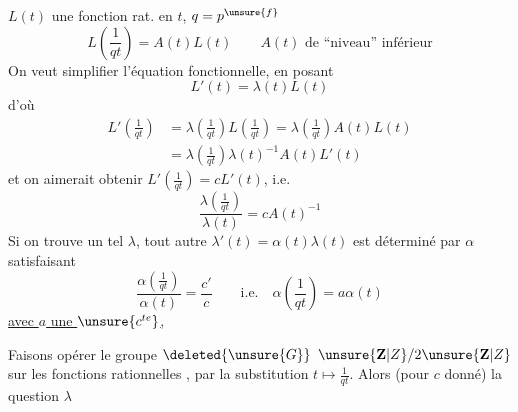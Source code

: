 $L(t)$ une fonction rat. en $t$,  $q=p^{\unsure{f}}$
\[
L\left(\frac1{qt}\right)=A(t)L(t)\qquad A(t)\text{ de ``niveau'' inférieur}
\]
On veut simplifier l'équation fonctionnelle, en posant
\[
L'(t)=\lambda(t)L(t)
\]
d'où
\[
\begin{aligned}
L'\left(\frac1{qt}\right)&=\lambda\left(\frac1{qt}\right)L\left(\frac1{qt}\right)=\lambda\left(\frac1{qt}\right)A(t)L(t)\\
&=\lambda\left(\frac1{qt}\right)\lambda(t)^{-1}A(t)L'(t)
\end{aligned}
\]
et on aimerait obtenir $L'(\frac1{qt})=cL'(t)$, i.e.
\[
\frac{\lambda(\frac1{qt})}{\lambda(t)}=cA(t)^{-1}
\]
Si on trouve un tel $\lambda$, tout autre $\lambda'(t)=\alpha(t)\lambda(t)$  est déterminé par $\alpha$ satisfaisant
\[
\frac{\alpha(\frac1{qt})}{\alpha(t)}=\frac{c'}c\qquad\text{i.e.}\quad\alpha\left(\frac1{qt}\right)=a\alpha(t)
\]
\uline{avec $a$ une $\unsure{c^{te}}$,}

Faisons opérer le groupe $\deleted{\unsure{G}}$ $\unsure{\mathbf{Z}|Z}/2\unsure{\mathbf{Z}|Z}$ sur les  fonctions rationnelles , par la substitution $t\longmapsto\frac1{qt}$. Alors (pour $c$ donné) la question  $\lambda$


